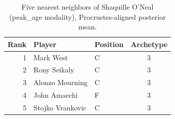 \begin{table}[htbp]
  \centering\small
  \begin{tabular}{rllc}
    \toprule
    Rank & Player & Position & Archetype \\
    \midrule
    1 & Mark West & C & 3 \\
    2 & Rony Seikaly & C & 3 \\
    3 & Alonzo Mourning & C & 3 \\
    4 & John Amaechi & F & 3 \\
    5 & Stojko Vrankovic & C & 3 \\
    \bottomrule
  \end{tabular}
  \caption{Five nearest neighbors of Shaquille O'Neal (peak_age modality), Procrustes-aligned posterior mean.}
  \label{tab:Shaquille_O_Neal_neighbors_peak_age}
\end{table}

